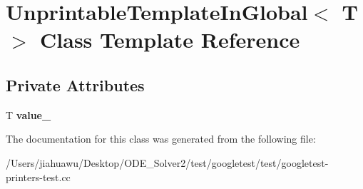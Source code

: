 \hypertarget{class_unprintable_template_in_global}{}\section{Unprintable\+Template\+In\+Global$<$ T $>$ Class Template Reference}
\label{class_unprintable_template_in_global}
\subsection*{Private Attributes}
\begin{DoxyCompactItemize}
\item 
\mbox{\label{class_unprintable_template_in_global_a5eb13fa2dc8de0e4ac8848f87df19283}} 
T {\bfseries value\+\_\+}
\end{DoxyCompactItemize}


The documentation for this class was generated from the following file\+:\begin{DoxyCompactItemize}
\item 
/\+Users/jiahuawu/\+Desktop/\+O\+D\+E\+\_\+\+Solver2/test/googletest/test/googletest-\/printers-\/test.\+cc\end{DoxyCompactItemize}
